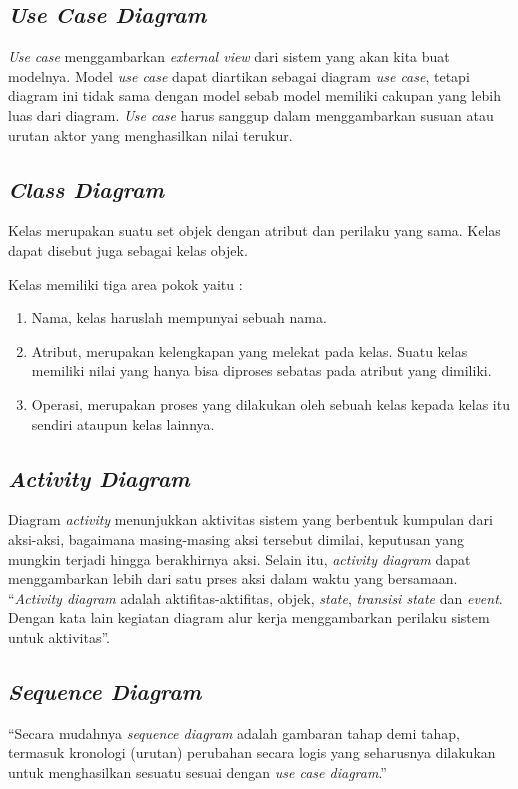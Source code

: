 \subsection{\emph{Use Case Diagram}}
\emph{Use case} menggambarkan \emph{external view} dari sistem yang akan kita buat modelnya. Model \emph{use case} dapat diartikan sebagai diagram \emph{use case}, tetapi diagram ini tidak sama dengan model sebab model memiliki cakupan yang lebih luas dari diagram. \emph{Use case} harus sanggup dalam menggambarkan susuan atau urutan aktor yang menghasilkan nilai terukur. \citep{Widodo2011Menggunakan}

\subsection{\emph{Class Diagram}}
Kelas merupakan suatu set objek dengan atribut dan perilaku yang sama. Kelas dapat disebut juga sebagai kelas objek. \citep{Whitten2004Metode}

Kelas memiliki tiga area pokok yaitu :

\begin{enumerate}
	\item Nama, kelas haruslah mempunyai sebuah nama.
	
	\item Atribut, merupakan kelengkapan yang melekat pada kelas. Suatu kelas memiliki nilai yang hanya bisa diproses sebatas pada atribut yang dimiliki.
	
	\item Operasi, merupakan proses yang dilakukan oleh sebuah kelas kepada kelas itu sendiri ataupun kelas lainnya.
\end{enumerate}

\subsection{\emph{Activity Diagram}}
Diagram \emph{activity} menunjukkan aktivitas sistem yang berbentuk kumpulan dari aksi-aksi, bagaimana masing-masing aksi tersebut dimilai, keputusan yang mungkin terjadi hingga berakhirnya aksi. Selain itu, \emph{activity diagram} dapat menggambarkan lebih dari satu prses aksi dalam waktu yang bersamaan. “\emph{Activity diagram } adalah aktifitas-aktifitas, objek, \emph{state}, \emph{transisi state} dan \emph{event}. Dengan kata lain kegiatan diagram alur kerja menggambarkan perilaku sistem untuk aktivitas”. \citep{Haviluddin2011Memahami} 

\subsection{\emph{Sequence Diagram}}
“Secara mudahnya \emph{sequence diagram} adalah gambaran tahap demi tahap, termasuk kronologi (urutan) perubahan secara logis yang seharusnya dilakukan untuk menghasilkan sesuatu sesuai dengan \emph{use case diagram}.”
\citep{Haviluddin2011Memahami}

